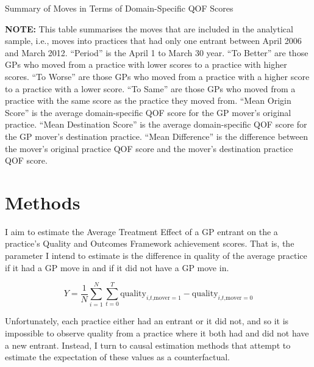 \documentclass[11pt]{article}
\begin{document}
\begin{landscape}
  \begin{table}[htp]
  \caption{Summary of Moves in Terms of Domain-Specific QOF Scores}
    \begin{threeparttable}
    

    \begin{tablenotes}
    \footnotesize
    \textbf{NOTE:} This table summarises the moves that are included in the analytical sample, i.e., moves into practices that had only one entrant between April 2006 and March 2012. ``Period'' is the April 1 to March 30 year. ``To Better'' are those GPs who moved from a practice with lower scores to a practice with higher scores. ``To Worse'' are those GPs who moved from a practice with a higher score to a practice with a lower score. ``To Same'' are those GPs who moved from a practice with the same score as the practice they moved from. ``Mean Origin Score'' is the average domain-specific QOF score for the GP mover's original practice. ``Mean Destination Score'' is the average domain-specific QOF score for the GP mover's destination practice. ``Mean Difference'' is the difference between the mover's original practice QOF score and the mover's destination practice QOF score.
    \end{tablenotes}
    \end{threeparttable}
    \label{tab:movesummary}
  \end{table}
\end{landscape}

\section{Methods}

I aim to estimate the Average Treatment Effect of a GP entrant on the a practice's Quality and Outcomes Framework achievement scores. That is, the parameter I intend to estimate is the difference in quality of the average practice if it had a GP move in and if it did not have a GP move in.

\begin{equation} \label{eq:1}
  Y = \frac{1}{N}\sum_{i=1}^{N}\sum_{t=0}^{T} \textrm{quality}_{i\textrm{,}t\textrm{,mover}=1} - \textrm{quality}_{i\textrm{,}t\textrm{,mover}=0}
\end{equation}

Unfortunately, each practice either had an entrant or it did not, and so it is impossible to observe quality from a practice where it both had and did not have a new entrant. Instead, I turn to causal estimation methods that attempt to estimate the expectation of these values as a counterfactual.
\end{document}
